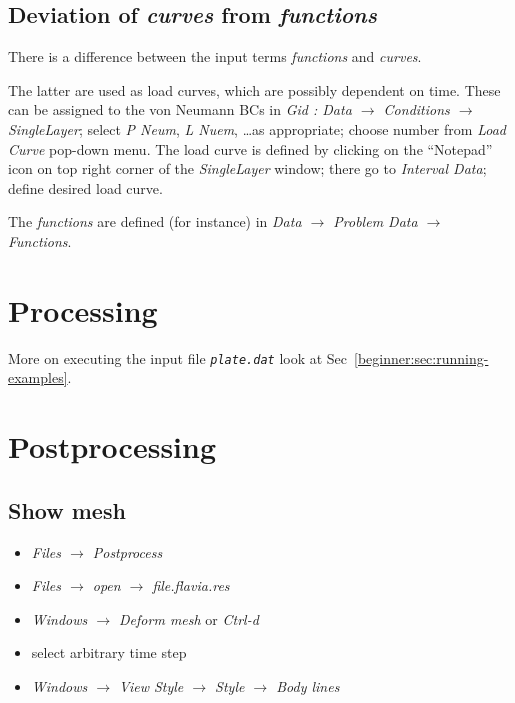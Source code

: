 \subsection{Deviation of \emph{curves} from \emph{functions}}

There is a difference between the \baci{} input terms \emph{functions}
and \emph{curves}.

The latter are used as load curves, which are possibly dependent on
time. These can be assigned to the von Neumann BCs in \emph{Gid :
Data $\rightarrow$ Conditions $\rightarrow$ SingleLayer}; select
\emph{P Neum}, \emph{L Nuem}, \ldots{}as appropriate; choose number
from \emph{Load Curve} pop-down menu. The load curve is defined by
clicking on the {}``Notepad'' icon on top right corner of the \emph{SingleLayer}
window; there go to \emph{Interval Data}; define desired load curve.

The \emph{functions} are defined (for instance) in \emph{Data $\rightarrow$
Problem Data $\rightarrow$ Functions}.


\section{Processing}

More on executing the input file \texttt{\emph{plate.dat}} look at
Sec~\ref{beginner:sec:running-examples}. 


\section{Postprocessing}\label{tut_struct:sec:postprocessing}


\subsection{Show mesh}

\label{sec:show-grid}

\begin{itemize}
\item \emph{Files $\rightarrow$ Postprocess}
\item \emph{Files $\rightarrow$ open $\rightarrow$ file.flavia.res}
\item \emph{Windows $\rightarrow$ Deform mesh} or \emph{Ctrl-d}
\item select arbitrary time step 
\item \emph{Windows $\rightarrow$ View Style $\rightarrow$ Style $\rightarrow$
Body lines}
\end{itemize}

